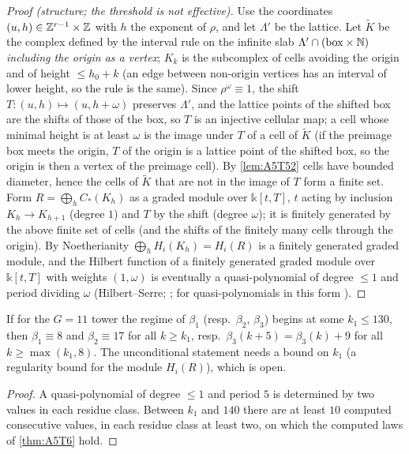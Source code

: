 \begin{proof}[Proof (structure; the threshold is not effective)]
Use the coordinates $(u,h)\in\mathbb Z^{r-1}\times\mathbb Z$ with $h$ the exponent of $\rho$, and let $\Lambda'$ be the lattice. Let $\tilde K$ be the complex defined by the interval rule on the infinite slab $\Lambda'\cap(\text{box}\times\mathbb N)$ \emph{including the origin as a vertex}; $K_k$ is the subcomplex of cells avoiding the origin and of height $\le h_0+k$ (an edge between non-origin vertices has an interval of lower height, so the rule is the same). Since $\rho^\omega\equiv1$, the shift $T:(u,h)\mapsto(u,h+\omega)$ preserves $\Lambda'$, and the lattice points of the shifted box are the shifts of those of the box, so $T$ is an injective cellular map; a cell whose minimal height is at least $\omega$ is the image under $T$ of a cell of $\tilde K$ (if the preimage box meets the origin, $T$ of the origin is a lattice point of the shifted box, so the origin is then a vertex of the preimage cell). By \cref{lem:A5T52} cells have bounded diameter, hence the cells of $\tilde K$ that are not in the image of $T$ form a finite set. Form $R=\bigoplus_hC_*(K_h)$ as a graded module over $\mathbb k[t,T]$, $t$ acting by inclusion $K_h\to K_{h+1}$ (degree $1$) and $T$ by the shift (degree $\omega$); it is finitely generated by the above finite set of cells (and the shifts of the finitely many cells through the origin). By Noetherianity $\bigoplus_hH_i(K_h)=H_i(R)$ is a finitely generated graded module, and the Hilbert function of a finitely generated graded module over $\mathbb k[t,T]$ with weights $(1,\omega)$ is eventually a quasi-polynomial of degree $\le1$ and period dividing $\omega$ (Hilbert--Serre; \cite{Eisenbud1995}; for quasi-polynomials in this form \cite{Stanley1997,Ehrhart1962}). \qedhere
\end{proof}
\begin{corollary}\label{cor:cond}
If for the $G=11$ tower the regime of $\beta_1$ (resp.\ $\beta_2$, $\beta_3$) begins at some $k_1\le130$, then $\beta_1\equiv8$ and $\beta_2\equiv17$ for all $k\ge k_1$, resp.\ $\beta_3(k+5)=\beta_3(k)+9$ for all $k\ge\max(k_1,8)$. The unconditional statement needs a bound on $k_1$ (a regularity bound for the module $H_i(R)$), which is open.
\end{corollary}
\begin{proof}
A quasi-polynomial of degree $\le1$ and period $5$ is determined by two values in each residue class. Between $k_1$ and $140$ there are at least $10$ computed consecutive values, in each residue class at least two, on which the computed laws of \cref{thm:A5T6} hold. \qedhere
\end{proof}
